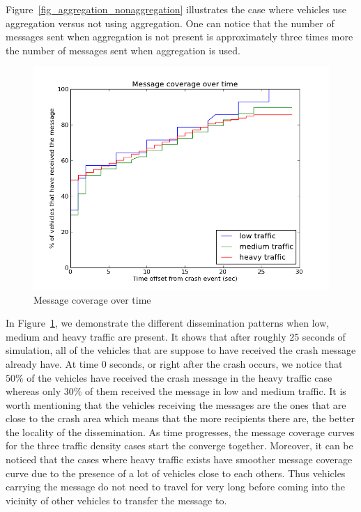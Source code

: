 \documentclass{IEEEtran}
\begin{document}
Figure~\ref{fig_aggregation_nonaggregation} illustrates the case where vehicles use aggregation versus not using aggregation.
One can notice that the number of messages sent when aggregation is not present is approximately three times more the number of messages sent when aggregation is used.

\noindent
\begin{figure}[h]
\centering
\includegraphics[scale=0.45]{Figure_03.png}
\caption{Message coverage over time}
\label{fig_msg_coverage}
\end{figure}

In Figure~\ref{fig_msg_coverage}, we demonstrate the different dissemination patterns when low, medium and heavy traffic are present.
It shows that after roughly $25$ seconds of simulation, all of the vehicles that are suppose to have received the crash message already have.
At time $0$ seconds, or right after the crash occurs, we notice that $50\%$ of the vehicles have received the crash message in the heavy traffic case whereas only $30\%$ of them received the message in low and medium traffic.
It is worth mentioning that the vehicles receiving the messages are the ones that are close to the crash area which means that the more recipients there are, the better the locality of the dissemination.
As time progresses, the message coverage curves for the three traffic density cases start the converge together.
Moreover, it can be noticed that the cases where heavy traffic exists have smoother message coverage curve due to the presence of a lot of vehicles close to each others.
Thus vehicles carrying the message do not need to travel for very long before coming into the vicinity of other vehicles to transfer the message to.
\end{document}
